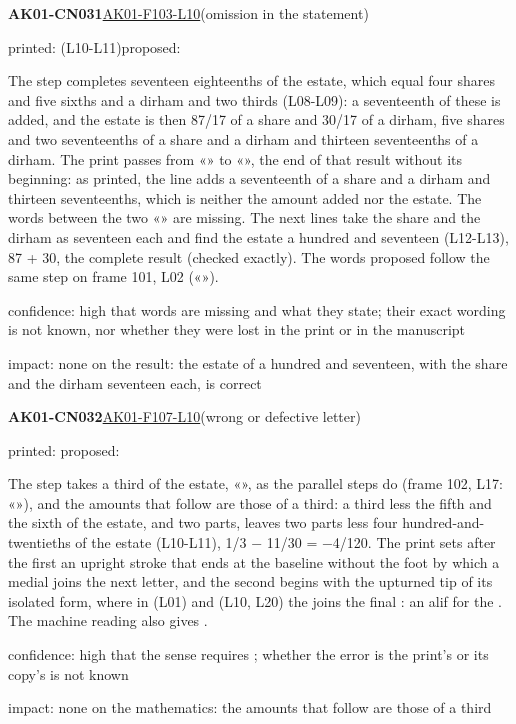 \documentclass[11pt]{article}
\begin{document}
\noindent\textbf{AK01-CN031}\enspace\hyperlink{AK01-F103-L10}{AK01-F103-L10}\enspace(omission in the statement)\par\noindent printed:  (L10-L11)\enspace proposed: \par\noindent The step completes seventeen eighteenths of the estate, which equal four shares and five sixths and a dirham and two thirds (L08-L09): a seventeenth of these is added, and the estate is then 87/17 of a share and 30/17 of a dirham, five shares and two seventeenths of a share and a dirham and thirteen seventeenths of a dirham. The print passes from «» to «», the end of that result without its beginning: as printed, the line adds a seventeenth of a share and a dirham and thirteen seventeenths, which is neither the amount added nor the estate. The words between the two «» are missing. The next lines take the share and the dirham as seventeen each and find the estate a hundred and seventeen (L12-L13), 87 + 30, the complete result (checked exactly). The words proposed follow the same step on frame 101, L02 («»).\par\noindent confidence: high that words are missing and what they state; their exact wording is not known, nor whether they were lost in the print or in the manuscript\par\noindent impact: none on the result: the estate of a hundred and seventeen, with the share and the dirham seventeen each, is correct\par\medskip
\noindent\textbf{AK01-CN032}\enspace\hyperlink{AK01-F107-L10}{AK01-F107-L10}\enspace(wrong or defective letter)\par\noindent printed: \enspace proposed: \par\noindent The step takes a third of the estate, «», as the parallel steps do (frame 102, L17: «»), and the amounts that follow are those of a third: a third less the fifth and the sixth of the estate, and two parts, leaves two parts less four hundred-and-twentieths of the estate (L10-L11), 1/3 − 11/30 = −4/120. The print sets after the first  an upright stroke that ends at the baseline without the foot by which a medial  joins the next letter, and the second  begins with the upturned tip of its isolated form, where in  (L01) and  (L10, L20) the  joins the final : an alif for the . The machine reading also gives .\par\noindent confidence: high that the sense requires ; whether the error is the print's or its copy's is not known\par\noindent impact: none on the mathematics: the amounts that follow are those of a third\par\medskip
\end{document}
